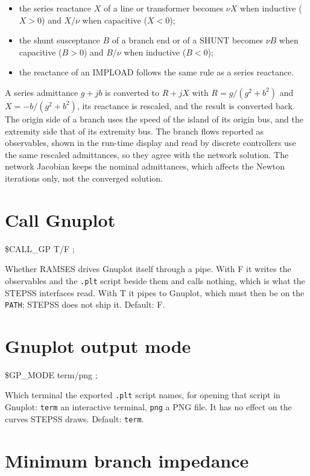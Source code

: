 \begin{itemize}
\item the series reactance $X$ of a line or transformer becomes $\nu X$ when
inductive ($X > 0$) and $X/\nu$ when capacitive ($X < 0$);
\item the shunt susceptance $B$ of a branch end or of a SHUNT becomes $\nu B$
when capacitive ($B > 0$) and $B/\nu$ when inductive ($B < 0$);
\item the reactance of an IMPLOAD follows the same rule as a series reactance.
\end{itemize}

A series admittance $g + jb$ is converted to $R + jX$ with
$R = g/(g^2+b^2)$ and $X = -b/(g^2+b^2)$, its reactance is rescaled, and the
result is converted back. The origin side of a branch uses the speed of the
island of its origin bus, and the extremity side that of its extremity bus. The
branch flows reported as observables, shown in the run-time display and read by
discrete controllers use the same rescaled admittances, so they agree with the
network solution. The network Jacobian keeps the nominal admittances, which
affects the Newton iterations only, not the converged solution.


\section{Call Gnuplot}

 \$CALL\_GP T/F ;

Whether RAMSES drives Gnuplot itself through a pipe. With F it writes the
observables and the {\tt .plt} script beside them and calls nothing, which is
what the STEPSS interfaces read. With T it pipes to Gnuplot, which must then be
on the {\tt PATH}; STEPSS does not ship it. Default: F.


\section{Gnuplot output mode}

 \$GP\_MODE term/png ;

Which terminal the exported {\tt .plt} script names, for opening that script in
Gnuplot: {\tt term} an interactive terminal, {\tt png} a
PNG file. It has no effect on the curves STEPSS draws. Default: {\tt term}.


\section{Minimum branch impedance}

